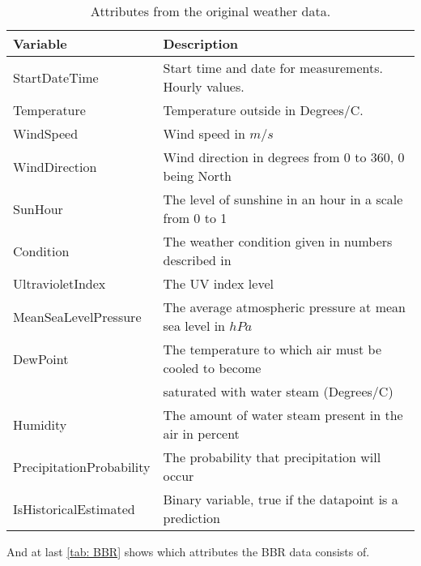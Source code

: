 \begin{table}[ht]
    \centering
    \begin{tabular}{ll}
     \hline
     \textbf{Variable} & \textbf{Description} \\
    \hline
    \hline
    StartDateTime  &  Start time and date for measurements. Hourly values.\\
    Temperature  &  Temperature outside in Degrees/C. \\
    WindSpeed  & Wind speed in $m/s$\\
    WindDirection  & Wind direction in degrees from 0 to 360, 0 being North \\
    SunHour  & The level of sunshine in an hour in a scale from 0 to 1 \\
    Condition  & The weather condition given in numbers described in \cite{condition} \\
    UltravioletIndex  & The UV index level \\
    MeanSeaLevelPressure  & The average atmospheric pressure at mean sea level in $hPa$ \\
    DewPoint  &  The temperature to which air must be cooled to become \\ & saturated with water steam (Degrees/C)\\
    Humidity  & The amount of water steam present in the air in percent\\
    PrecipitationProbability & The probability that precipitation will occur\\
    IsHistoricalEstimated & Binary variable, true if the datapoint is a prediction \\
    \hline
    \end{tabular}
    \caption{Attributes from the original weather data.}
    \label{tab: weatherdata}
\end{table}
\noindent And at last \cref{tab: BBR} shows which attributes the BBR data consists of.
